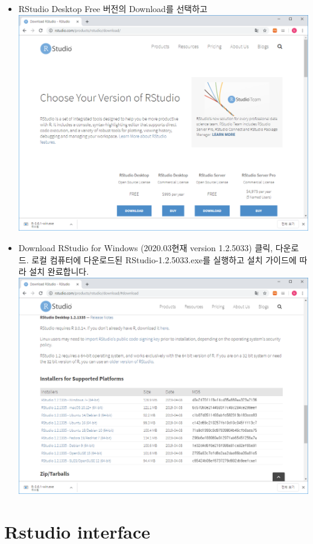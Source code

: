 \documentclass[
]{book}
\begin{document}
\begin{itemize}
\item
  RStudio Desktop Free 버전의 Download를 선택하고
  \includegraphics{images/01/01-09.PNG}
\item
  Download RStudio for Windows (2020.03현재 version 1.2.5033) 클릭, 다운로드. 로컬 컴퓨터에 다운로드된 RStudio-1.2.5033.exe를 실행하고 설치 가이드에 따라 설치 완료합니다.
  \includegraphics{images/01/01-10.PNG}
\end{itemize}

\hypertarget{rstudio-interface}{%
\section{Rstudio interface}\label{rstudio-interface}}
\end{document}
